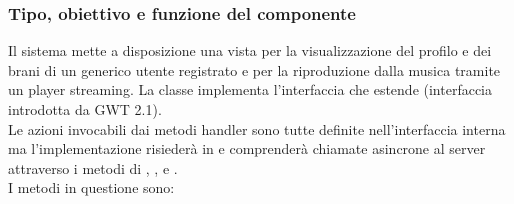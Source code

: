 \subsubsection*{Tipo, obiettivo e funzione del componente}
Il sistema mette a disposizione una vista per la visualizzazione del profilo e
dei brani di un generico utente registrato e per la riproduzione dalla musica
tramite un player streaming. La classe  implementa
l'interfaccia  che estende  (interfaccia introdotta
da GWT 2.1). \\
Le azioni invocabili dai metodi handler sono tutte definite nell'interfaccia
interna  ma l'implementazione risieder\`a in 
e comprender\`a chiamate asincrone al server attraverso i metodi di
, ,  e .\\
I metodi in questione sono:
